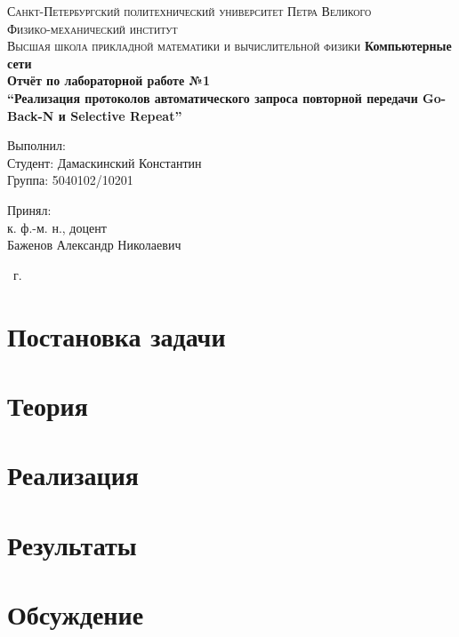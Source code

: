 \documentclass[14pt,a4paper,article]{ncc}
\begin{document}
\begin{titlepage}
    \begin{center}
        \textsc{
            Санкт-Петербургский политехнический университет Петра Великого \\[5mm]
            Физико-механический институт\\[2mm]
            Высшая школа прикладной математики и вычислительной физики
        }   
        \vfill
        \textbf{\large
            Компьютерные сети\\
            Отчёт по лабораторной работе №1 \\
            ``Реализация протоколов автоматического запроса повторной передачи
            Go-Back-N и Selective Repeat'' \\[3mm]
        }                
    \end{center}

    \vfill
    \hfill
    \begin{minipage}{0.5\textwidth}
        Выполнил: \\[2mm]   
		Студент: Дамаскинский Константин \\
		Группа: 5040102/10201\\
    \end{minipage}

	\hfill
	\begin{minipage}{0.5\textwidth}
		Принял: \\[2mm]
		к. ф.-м. н., доцент \\   
		Баженов Александр Николаевич
	\end{minipage}

    \vfill
    \begin{center}
        \theyear\ г.
    \end{center}
\end{titlepage}

\tableofcontents
\listoffigures
\newpage

\section{Постановка задачи}


\section{Теория}


\section{Реализация}


\section{Результаты}


\section{Обсуждение}


\printbibliography


\end{document}
